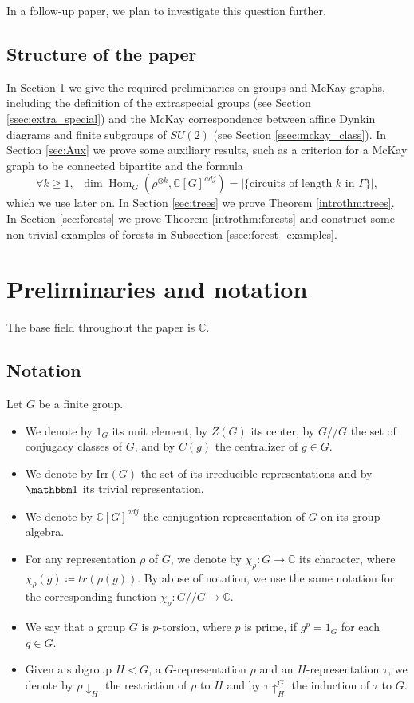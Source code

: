 \documentclass[ALCO]{cedram}
\newcommand{\Hom}{\operatorname{Hom}}
\newcommand{\triv}{{\mathbbm 1}}
\newcommand{\C}{{\mathbb C}}
\newcommand{\abs}[1]{\left|{#1}\right|}
\newcommand{\Hom}{\operatorname{Hom}}
\begin{document}
In a follow-up paper, we plan to investigate this question further.
\subsection{Structure of the paper}
In Section \ref{sec:prelim} we give the required preliminaries on groups and McKay graphs, including the definition of the extraspecial groups (see Section \ref{ssec:extra_special}) and the McKay correspondence between affine Dynkin diagrams and finite subgroups of $SU(2)$ (see Section \ref{ssec:mckay_class}). In Section \ref{sec:Aux} we prove some auxiliary results, such as a criterion for a McKay graph {to be  connected bipartite} and the formula $$\forall k\geq 1, \;\;
\dim \Hom_G(\rho^{\otimes k}, \C[G]^{adj}) = \abs{\{\text{circuits of length } k \text{ in } \Gamma \}},  $$
which we use later on.
In Section \ref{sec:trees} we prove Theorem \ref{introthm:trees}. In Section \ref{sec:forests} we prove Theorem \ref{introthm:forests} and construct some non-trivial examples of forests in Subsection \ref{ssec:forest_examples}. 




\section{Preliminaries and notation}\label{sec:prelim}
The base field throughout the paper is $\C$.
\subsection{Notation}
\begin{nota}
 Let $G$ be a finite group.
 \begin{itemize}
 \item We denote by $1_G$ its unit element, by $Z(G)$ its center, by $G//G$ the set of conjugacy classes of $G$, and by $C(g)$ the centralizer of $g\in G$.
  \item We denote by $\mathrm{Irr}(G)$ the set of its irreducible representations and by $\triv$ its trivial representation. 
  \item We denote by $\C[G]^{adj}$ the conjugation representation of $G$ on its group algebra.
  \item For any representation $\rho$ of $G$, we denote by $\chi_\rho: G\to \C$ its character, where $\chi_\rho(g)\coloneqq tr (\rho(g))$. By abuse of notation, we use the same notation for the corresponding function $\chi_\rho: G//G \to \C$.
 \item We say that a group $G$ is $p$-torsion, where $p$ is prime, if $g^p = 1_G$ for each $g \in G$.
 \item Given a subgroup $H < G$, a $G$-representation $\rho$ and an $H$-representation $\tau$, we denote by $\rho \downarrow_H$ the restriction of $\rho$ to $H$ and by $\tau \uparrow^G_H$ the induction of $\tau$ to $G$.
 \end{itemize}

\end{nota}
\end{document}
